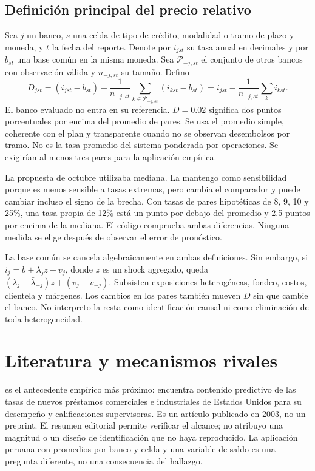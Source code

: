 \documentclass[11pt]{article}
\theoremstyle{definition}\newtheorem{assumption}{Supuesto}
\begin{document}
\subsection{Definición principal del precio relativo}
Sea $j$ un banco, $s$ una celda de tipo de crédito, modalidad o tramo de plazo
y moneda, y $t$ la fecha del reporte. Denote por $i_{jst}$ su tasa anual en
decimales y por $b_{st}$ una base común en la misma moneda. Sea
$\mathcal P_{-j,st}$ el conjunto de otros bancos con observación válida y
$n_{-j,st}$ su tamaño. Defino
\begin{equation}\label{eq:D}
D_{jst}=(i_{jst}-b_{st})-
\frac{1}{n_{-j,st}}\sum_{k\in\mathcal P_{-j,st}}(i_{kst}-b_{st})
=i_{jst}-\frac{1}{n_{-j,st}}\sum_k i_{kst}.
\end{equation}
El banco evaluado no entra en su referencia. $D=0.02$ significa dos puntos
porcentuales por encima del promedio de pares. Se usa el promedio simple,
coherente con el plan y transparente cuando no se observan desembolsos por
tramo. No es la tasa promedio del sistema ponderada por operaciones.
Se exigirían al menos tres pares para la aplicación empírica.

La propuesta de octubre utilizaba mediana. La mantengo como sensibilidad
porque es menos sensible a tasas extremas, pero cambia el comparador y puede
cambiar incluso el signo de la brecha. Con tasas de pares hipotéticas de
8, 9, 10 y 25\%, una tasa propia de 12\% está un punto por debajo del promedio
y 2.5 puntos por encima de la mediana. El código comprueba ambas diferencias.
Ninguna medida se elige después de observar el error de pronóstico.

La base común se cancela algebraicamente en ambas definiciones. Sin embargo,
si $i_j=b+\lambda_j z+v_j$, donde $z$ es un shock agregado, queda
$(\lambda_j-\bar\lambda_{-j})z+(v_j-\bar v_{-j})$. Subsisten exposiciones
heterogéneas, fondeo, costos, clientela y márgenes. Los cambios en los pares
también mueven $D$ sin que cambie el banco. No interpreto la resta como
identificación causal ni como eliminación de toda heterogeneidad.

\section{Literatura y mecanismos rivales}
\citet{morgan2003} es el antecedente empírico más próximo: encuentra contenido
predictivo de las tasas de nuevos préstamos comerciales e industriales de
Estados Unidos para su desempeño y calificaciones supervisoras. Es un artículo
publicado en 2003, no un preprint. El resumen editorial permite verificar el
alcance; no atribuyo una magnitud o un diseño de identificación que no haya
reproducido. La aplicación peruana con promedios por banco y celda y una
variable de saldo es una pregunta diferente, no una consecuencia del hallazgo.
\end{document}
